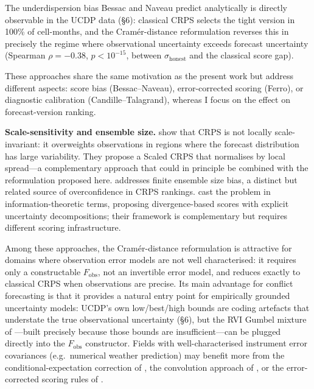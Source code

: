 The underdispersion bias Bessac and Naveau predict analytically is directly observable in the UCDP data (\S6): classical CRPS selects the tight version in 100\% of cell-months, and the Cram\'er-distance reformulation reverses this in precisely the regime where observational uncertainty exceeds forecast uncertainty (Spearman $\rho = -0.38$, $p < 10^{-15}$, between $\sigma_\text{honest}$ and the classical score gap).

These approaches share the same motivation as the present work but address different aspects: score bias (Bessac--Naveau), error-corrected scoring (Ferro), or diagnostic calibration (Candille--Talagrand), whereas I focus on the effect on forecast-version ranking.

\textbf{Scale-sensitivity and ensemble size.} \citet{bolin2023local} show that CRPS is not locally scale-invariant: it overweights observations in regions where the forecast distribution has large variability. They propose a Scaled CRPS that normalises by local spread---a complementary approach that could in principle be combined with the reformulation proposed here. \citet{ferro2017fair} addresses finite ensemble size bias, a distinct but related source of overconfidence in CRPS rankings. \citet{weijs2011accounting} cast the problem in information-theoretic terms, proposing divergence-based scores with explicit uncertainty decompositions; their framework is complementary but requires different scoring infrastructure.

Among these approaches, the Cram\'er-distance reformulation is attractive for domains where observation error models are not well characterised: it requires only a constructable $F_\text{obs}$, not an invertible error model, and reduces exactly to classical CRPS when observations are precise. Its main advantage for conflict forecasting is that it provides a natural entry point for empirically grounded uncertainty models: UCDP's own low/best/high bounds are coding artefacts that understate the true observational uncertainty (\S6), but the RVI Gumbel mixture of \citet{vesco2026uncertainty}---built precisely because those bounds are insufficient---can be plugged directly into the $F_\text{obs}$ constructor. Fields with well-characterised instrument error covariances (e.g.\ numerical weather prediction) may benefit more from the conditional-expectation correction of \citet{bessac2021forecast}, the convolution approach of \citet{brocker2007scoring}, or the error-corrected scoring rules of \citet{ferro2017observation}.

